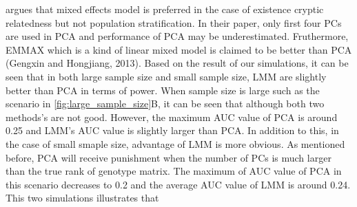 \documentclass[12pt]{article}
\begin{document}
\citet{wang_analytical_2013} argues that mixed effects model is preferred in the case of existence cryptic relatedness but not population stratification.
In their paper, only first four PCs are used in PCA and performance of PCA may be underestimated.
Fruthermore, EMMAX which is a kind of linear mixed model is claimed to be better than PCA (Gengxin and Hongjiang, 2013).
Based on the result of our simulations, it can be seen that in both large sample size and small sample size, LMM are slightly better than PCA in terms of power.
When sample size is large such as the scenario in \cref{fig:large_sample_size}B, it can be seen that although both two methods's are not good.
However, the maximum AUC value of PCA is around 0.25 and LMM's AUC value is slightly larger than PCA.
In addition to this, in the case of small smaple size, advantage of LMM is more obvious.
As mentioned before, PCA will receive punishment when the number of PCs is much larger than the true rank of genotype matrix.
The maximum of AUC value of PCA in this scenario decreases to 0.2 and the average AUC value of LMM is around 0.24.
This two simulations illustrates that 

\citep{sul_mixed_2013}
\citep{price_response_2013}

\citep{tucker_improving_2014}

\printbibliography
\end{document}
